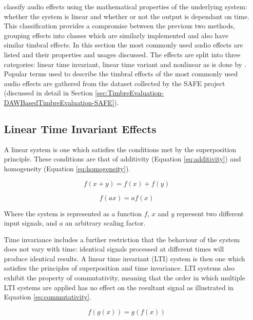 	\citet{eichas2015feature} classify audio effects using the mathematical properties of the underlying system:
	whether the system is linear and whether or not the output is dependant on time. This classification provides a
	compromise between the previous two methods, grouping effects into classes which are similarly implemented and also
	have similar timbral effects. In this section the most commonly used audio effects are listed and their properties
	and usages discussed. The effects are split into three categories: linear time invariant, linear time variant and
	nonlinear as is done by \citet{eichas2015feature}. Popular terms used to describe the timbral effects of the most
	commonly used audio effects are gathered from the dataset collected by the SAFE project (discussed in detail in
	Section \ref{sec:TimbreEvaluation-DAWBasedTimbreEvaluation-SAFE}).

	\subsection{Linear Time Invariant Effects}
	\label{sec:Timbre-AudioProcessing-LTI}
		A linear system is one which satisfies the conditions met by the superposition principle. These conditions
		are that of additivity (Equation \ref{eq:additivity}) and homogeneity (Equation \ref{eq:homogeneity}).

		\begin{equation} f(x + y) = f(x) + f(y) \label{eq:additivity} \end{equation}

		\begin{equation} f(ax) = af(x) \label{eq:homogeneity} \end{equation}

		Where the system is represented as a function $f$, $x$ and $y$ represent two different input signals, and
		$a$ an arbitrary scaling factor.

		Time invariance includes a further restriction that the behaviour of the system does not vary with time:
		identical signals processed at different times will produce identical results. A linear time invariant
		(LTI) system is then one which satisfies the principles of superposition and time invariance. LTI systems
		also exhibit the property of commutativity, meaning that the order in which multiple LTI systems are
		applied has no effect on the resultant signal as illustrated in Equation \ref{eq:commutativity}.

		\begin{equation} f(g(x)) = g(f(x)) \label{eq:commutativity} \end{equation}

